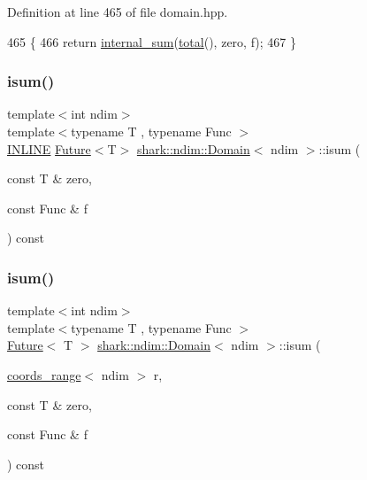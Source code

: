 Definition at line 465 of file domain.\+hpp.


\begin{DoxyCode}
465                                                                               \{
466             \textcolor{keywordflow}{return} \hyperlink{classshark_1_1ndim_1_1_domain_ae6b753c7b16ffd14e6247d4b00c92d35}{internal\_sum}(\hyperlink{classshark_1_1ndim_1_1_domain_ae4357c99519b3efbaf2544828629de87}{total}(), zero, f);
467         \}
\end{DoxyCode}
\hypertarget{classshark_1_1ndim_1_1_domain_ab00f61852f9957c033d36ddb2f49f0eb}{}\label{classshark_1_1ndim_1_1_domain_ab00f61852f9957c033d36ddb2f49f0eb} 
\subsubsection{\texorpdfstring{isum()}{isum()}\hspace{0.1cm}{\footnotesize\ttfamily [1/3]}}
{\footnotesize\ttfamily template$<$int ndim$>$ \\
template$<$typename T , typename Func $>$ \\
\hyperlink{common_8hpp_a2eb6f9e0395b47b8d5e3eeae4fe0c116}{I\+N\+L\+I\+NE} \hyperlink{structshark_1_1_future}{Future}$<$T$>$ \hyperlink{classshark_1_1ndim_1_1_domain}{shark\+::ndim\+::\+Domain}$<$ ndim $>$\+::isum (\begin{DoxyParamCaption}\item[{const T \&}]{zero,  }\item[{const Func \&}]{f }\end{DoxyParamCaption}) const}

\hypertarget{classshark_1_1ndim_1_1_domain_a5bf4e150338d25522399b4e63c908144}{}\label{classshark_1_1ndim_1_1_domain_a5bf4e150338d25522399b4e63c908144} 
\subsubsection{\texorpdfstring{isum()}{isum()}\hspace{0.1cm}{\footnotesize\ttfamily [2/3]}}
{\footnotesize\ttfamily template$<$int ndim$>$ \\
template$<$typename T , typename Func $>$ \\
\hyperlink{structshark_1_1_future}{Future}$<$ T $>$ \hyperlink{classshark_1_1ndim_1_1_domain}{shark\+::ndim\+::\+Domain}$<$ ndim $>$\+::isum (\begin{DoxyParamCaption}\item[{\hyperlink{structshark_1_1ndim_1_1coords__range}{coords\+\_\+range}$<$ ndim $>$}]{r,  }\item[{const T \&}]{zero,  }\item[{const Func \&}]{f }\end{DoxyParamCaption}) const}



